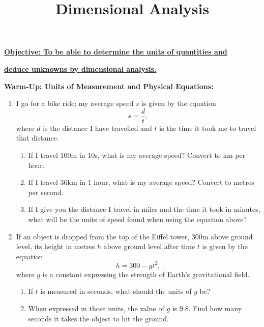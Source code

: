 \documentclass{article}
\begin{document}
\title{Dimensional Analysis}
\date{}

\maketitle
\thispagestyle{empty}

\Large

\vskip -10mm

\textbf{\underline{Objective: To be able to determine the units of quantities and}}

\textbf{\underline{deduce unknowns by dimensional analysis.}}



\vspace{5mm}

\textbf{Warm-Up: Units of Measurement and Physical Equations:}\bigskip


\begin{enumerate}
	\item I go for a bike ride; my average speed $s$ is given by the equation
		\[s=\frac{d}{t},\]
		where $d$ is the distance I have travelled and $t$ is the time it took me to travel that distance.
		\begin{enumerate}
			\item If I travel 100m in 10s, what is my average speed? Convert to km per hour.
			\item If I travel 36km in 1 hour, what is my average speed? Convert to metres per second.
			\item If I give you the distance I travel in miles and the time it took in minutes, what will be the units of speed found when using the equation above?
		\end{enumerate}
	\item If an object is dropped from the top of the Eiffel tower, 300m above ground level, its height in metres $h$ above ground level after time $t$ is given by the equation
		\[h=300-gt^2,\]
		where $g$ is a constant expressing the strength of Earth's gravitational field.
		\begin{enumerate}
			\item If $t$ is measured in seconds, what should the units of $g$ be?
			\item When expressed in those units, the value of $g$ is $9.8$. Find how many seconds it takes the object to hit the ground.
		\end{enumerate}
\end{enumerate}


\clearpage
\end{document}
